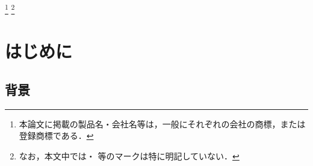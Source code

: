 \documentclass[a4paper,11pt,uplatex]{ujreport}
\begin{document}

\footnote[0]{本論文に掲載の製品名・会社名等は，一般にそれぞれの会社の商標，または登録商標である．}
\footnote[0]{なお，本文中では\texttrademark ・ \textregistered 等のマークは特に明記していない．}


\setcounter{page}{0}

\tableofcontents

\clearpage


\chapter{はじめに}
\label{chap:Introduction}


\section{背景}
\label{sec:背景}
\end{document}
